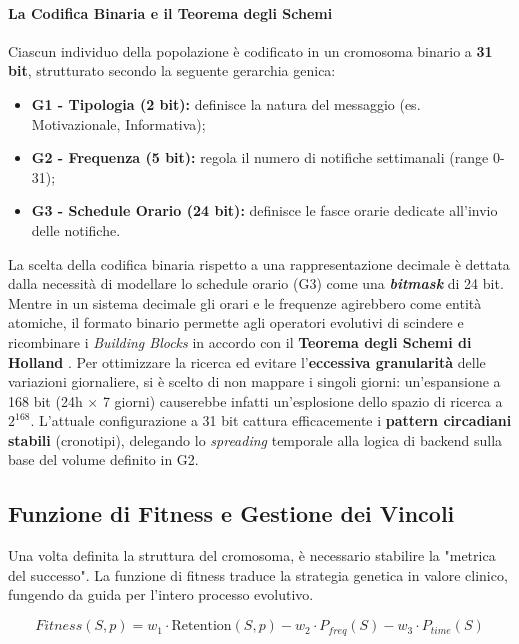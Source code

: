 \paragraph{La Codifica Binaria e il Teorema degli Schemi}
Ciascun individuo della popolazione è codificato in un cromosoma binario a \textbf{31 bit}, strutturato secondo la seguente gerarchia genica:
\begin{itemize}
    \item \textbf{G1 - Tipologia (2 bit):} definisce la natura del messaggio (es. Motivazionale, Informativa);
    \item \textbf{G2 - Frequenza (5 bit):} regola il numero di notifiche settimanali (range 0-31);
    \item \textbf{G3 - Schedule Orario (24 bit):} definisce le fasce orarie dedicate all'invio delle notifiche.
\end{itemize}
La scelta della codifica binaria rispetto a una rappresentazione decimale è dettata dalla necessità di modellare lo schedule orario (G3) come una \textbf{\textit{bitmask}} di 24 bit. Mentre in un sistema decimale gli orari e le frequenze agirebbero come entità atomiche, il formato binario permette agli operatori evolutivi di scindere e ricombinare i \textit{Building Blocks} in accordo con il \textbf{Teorema degli Schemi di Holland} \cite{holland1992adaptation}. Per ottimizzare la ricerca ed evitare l'\textbf{eccessiva granularità} delle variazioni giornaliere, si è scelto di non mappare i singoli giorni: un'espansione a 168 bit (24h $\times$ 7 giorni) causerebbe infatti un'esplosione dello spazio di ricerca a $2^{168}$. L'attuale configurazione a 31 bit cattura efficacemente i \textbf{pattern circadiani stabili} (cronotipi), delegando lo \textit{spreading} temporale alla logica di backend sulla base del volume definito in G2.

\subsection{Funzione di Fitness e Gestione dei Vincoli}
Una volta definita la struttura del cromosoma, è necessario stabilire la "metrica del successo". La funzione di fitness traduce la strategia genetica in valore clinico, fungendo da guida per l'intero processo evolutivo.

\begin{equation}
    Fitness(S, p) = w_1 \cdot \text{Retention}(S, p) - w_2 \cdot P_{freq}(S) - w_3 \cdot P_{time}(S)
\end{equation}

